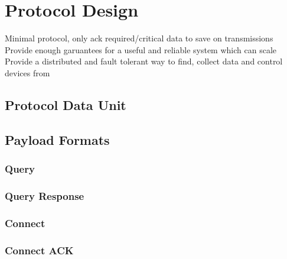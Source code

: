\documentclass{l4proj}
\begin{document}

\section{Protocol Design} %
\label{sec:protocol_design}
Minimal protocol, only ack required/critical data to save on transmissions
Provide enough garuantees for a useful and reliable system which can scale
Provide a distributed and fault tolerant way to find, collect data and control devices from



\subsection{Protocol Data Unit} %
\label{sub:protocol_data_unit}


\subsection{Payload Formats} %
\label{sub:payload_formats}

\subsubsection{Query} %
\label{ssub:query}
		

\subsubsection{Query Response} %
\label{ssub:query_response}


\subsubsection{Connect} %
\label{ssub:connect}


\subsubsection{Connect ACK} %
\label{ssub:connect_ack}

\end{document}
